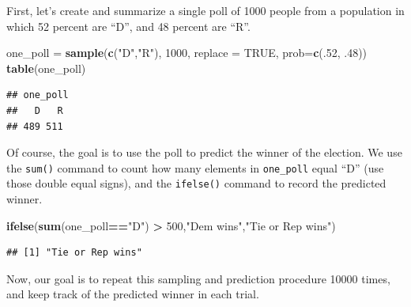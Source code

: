 \documentclass[
]{book}
\newenvironment{Shaded}{\begin{snugshade}}{\end{snugshade}}
\newcommand{\AttributeTok}[1]{\textcolor[rgb]{0.13,0.29,0.53}{#1}}
\newcommand{\ConstantTok}[1]{\textcolor[rgb]{0.56,0.35,0.01}{#1}}
\newcommand{\DecValTok}[1]{\textcolor[rgb]{0.00,0.00,0.81}{#1}}
\newcommand{\FunctionTok}[1]{\textcolor[rgb]{0.13,0.29,0.53}{\textbf{#1}}}
\newcommand{\NormalTok}[1]{#1}
\newcommand{\OtherTok}[1]{\textcolor[rgb]{0.56,0.35,0.01}{#1}}
\newcommand{\SpecialCharTok}[1]{\textcolor[rgb]{0.81,0.36,0.00}{\textbf{#1}}}
\newcommand{\StringTok}[1]{\textcolor[rgb]{0.31,0.60,0.02}{#1}}
\theoremstyle{definition}
\theoremstyle{definition}
\theoremstyle{definition}
\theoremstyle{definition}
\theoremstyle{remark}
\begin{document}
First, let's create and summarize a single poll of 1000 people from a population in which 52 percent are ``D'', and 48 percent are ``R''.

\begin{Shaded}
\begin{Highlighting}[]
\NormalTok{one\_poll }\OtherTok{=} \FunctionTok{sample}\NormalTok{(}\FunctionTok{c}\NormalTok{(}\StringTok{"D"}\NormalTok{,}\StringTok{"R"}\NormalTok{), }\DecValTok{1000}\NormalTok{, }\AttributeTok{replace =} \ConstantTok{TRUE}\NormalTok{, }\AttributeTok{prob=}\FunctionTok{c}\NormalTok{(.}\DecValTok{52}\NormalTok{, .}\DecValTok{48}\NormalTok{))}
\FunctionTok{table}\NormalTok{(one\_poll)}
\end{Highlighting}
\end{Shaded}

\begin{verbatim}
## one_poll
##   D   R 
## 489 511
\end{verbatim}

Of course, the goal is to use the poll to predict the winner of the election.
We use the \texttt{sum()} command to count how many elements in \texttt{one\_poll} equal ``D'' (use those double equal signs), and the \texttt{ifelse()} command to record the predicted winner.

\begin{Shaded}
\begin{Highlighting}[]
\FunctionTok{ifelse}\NormalTok{(}\FunctionTok{sum}\NormalTok{(one\_poll}\SpecialCharTok{==}\StringTok{"D"}\NormalTok{) }\SpecialCharTok{\textgreater{}} \DecValTok{500}\NormalTok{,}\StringTok{"Dem wins"}\NormalTok{,}\StringTok{"Tie or Rep wins"}\NormalTok{)}
\end{Highlighting}
\end{Shaded}

\begin{verbatim}
## [1] "Tie or Rep wins"
\end{verbatim}

Now, our goal is to repeat this sampling and prediction procedure 10000 times, and keep track of the predicted winner in each trial.
\end{document}
